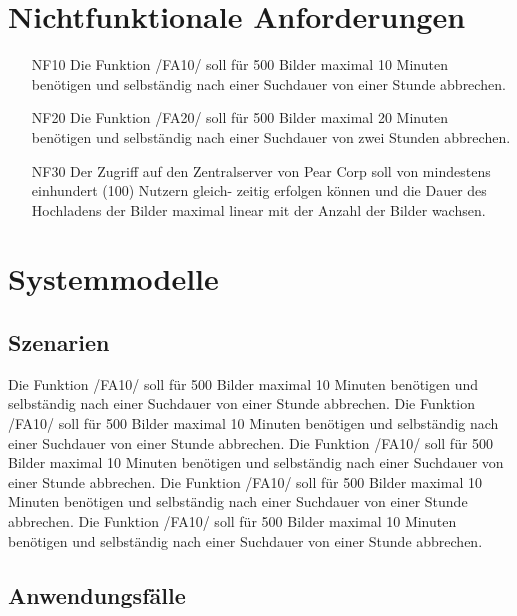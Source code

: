 \documentclass[parskip=full]{scrartcl}
\begin{document}
\section{Nichtfunktionale Anforderungen}
\begin{itemize}[nosep]
\item[NF10] Die Funktion /FA10/ soll für 500 Bilder maximal 10 Minuten benötigen und selbständig nach einer Suchdauer von einer Stunde abbrechen.
\item[NF20] Die Funktion /FA20/ soll für 500 Bilder maximal 20 Minuten benötigen und selbständig nach einer Suchdauer von zwei Stunden abbrechen.
\item[NF30] Der Zugriff auf den Zentralserver von Pear Corp soll von mindestens einhundert (100) Nutzern gleich-
zeitig erfolgen können und die Dauer des Hochladens der Bilder maximal linear mit der Anzahl der Bilder
wachsen.
\end{itemize}

\section{Systemmodelle}

\subsection{Szenarien}
\begin{flushleft}
    Die Funktion /FA10/ soll für 500 Bilder maximal 10 Minuten benötigen und selbständig nach einer Suchdauer von einer Stunde abbrechen.
    Die Funktion /FA10/ soll für 500 Bilder maximal 10 Minuten benötigen und selbständig nach einer Suchdauer von einer Stunde abbrechen.
    Die Funktion /FA10/ soll für 500 Bilder maximal 10 Minuten benötigen und selbständig nach einer Suchdauer von einer Stunde abbrechen.
    Die Funktion /FA10/ soll für 500 Bilder maximal 10 Minuten benötigen und selbständig nach einer Suchdauer von einer Stunde abbrechen.
    Die Funktion /FA10/ soll für 500 Bilder maximal 10 Minuten benötigen und selbständig nach einer Suchdauer von einer Stunde abbrechen.
\end{flushleft}

\subsection{Anwendungsfälle}
\end{document}
